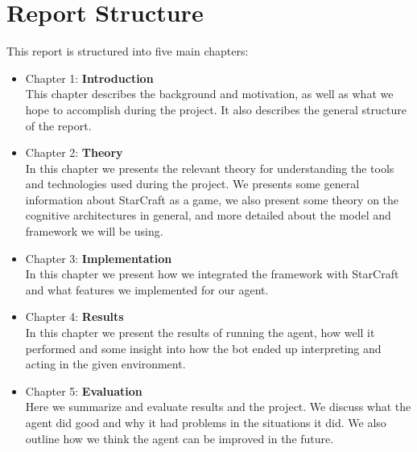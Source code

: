 \section{Report Structure}
\label{sec:structure}
This report is structured into five main chapters:
\begin{itemize}
\item Chapter 1: \textbf{Introduction} \\
This chapter describes the background and motivation, as well as what we hope to accomplish during the project. It also describes the general structure of the report.
\item Chapter 2: \textbf{Theory} \\
In this chapter we presents the relevant theory for understanding the tools and technologies used during the project. We presents some general information about StarCraft as a game, we also present some theory on the cognitive architectures in general, and more detailed about the model and framework we will be using.
\item Chapter 3: \textbf{Implementation} \\
In this chapter we present how we integrated the framework with StarCraft and what features we implemented for our agent.
\item Chapter 4: \textbf{Results} \\
In this chapter we present the results of running the agent, how well it performed and some insight into how the bot ended up interpreting and acting in the given environment.
\item Chapter 5: \textbf{Evaluation} \\
Here we summarize and evaluate results and the project. We discuss what the agent did good and why it had problems in the situations it did. We also outline how we think the agent can be improved in the future.

\end{itemize}
